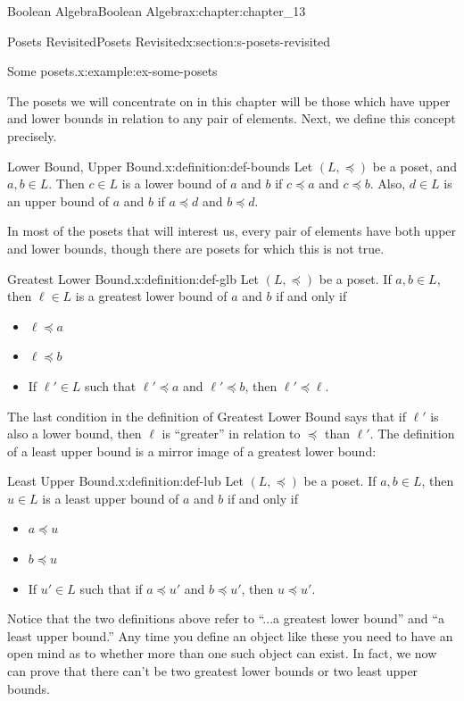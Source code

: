 \documentclass[twoside,10pt,]{book}
\numberwithin{equation}{section}
\begin{document}
\begin{chapterptx}{Boolean Algebra}{}{Boolean Algebra}{}{}{x:chapter:chapter_13}
\begin{sectionptx}{Posets Revisited}{}{Posets Revisited}{}{}{x:section:s-posets-revisited}
\begin{example}{Some posets.}{x:example:ex-some-posets}
%
\end{example}
The posets we will concentrate on in this chapter will be those which have upper and lower bounds in relation to any pair of elements. Next, we define this concept precisely.%
\begin{definition}{Lower Bound, Upper Bound.}{x:definition:def-bounds}%
%
%
Let \((L, \preceq)\) be a poset, and \(a, b \in  L\). Then \(c \in  L\) is a lower bound of \(a\) and \(b\) if \(c \preceq  a\) and \(c \preceq  b\). Also,  \(d \in  L\) is an upper bound of \(a\) and \(b\) if  \(a \preceq  d\) and \(b \preceq  d\).%
\end{definition}
In most of the posets that will interest us, every pair of elements have both upper and lower bounds, though there are posets for which this is not true.%
\begin{definition}{Greatest Lower Bound.}{x:definition:def-glb}%
%
Let \((L, \preceq)\) be a poset. If \(a, b \in  L\), then \(\ell \in  L\) is a greatest lower bound of \(a\) and \(b\)  if and only if%
\begin{itemize}[label=\textbullet]
\item{}\(\ell \preceq  a\)%
\item{}\(\ell \preceq  b\)%
\item{}If \(\ell' \in  L\) such that \(\ell' \preceq  a\) and \(\ell' \preceq  b\), then \(\ell' \preceq  \ell\).%
\end{itemize}
%
\end{definition}
The last condition in the definition of Greatest Lower Bound says that if  \(\ell'\)  is also a lower bound, then \(\ell\) is ``greater'' in relation to \(\preceq\) than \(\ell'\). The definition of a least upper bound is a mirror image of a greatest lower bound:%
\begin{definition}{Least Upper Bound.}{x:definition:def-lub}%
%
Let \((L, \preceq)\) be a poset. If \(a, b \in  L\), then \(u \in  L\) is a least upper bound of \(a\) and \(b\)  if and only if%
\begin{itemize}[label=\textbullet]
\item{}\(a \preceq  u\)%
\item{}\(b \preceq  u\)%
\item{}If \(u' \in  L\) such that if \(a \preceq  u'\) and \(b \preceq  u'\), then \(u \preceq  u'\).%
\end{itemize}
%
\end{definition}
Notice that the two definitions above refer to ``...a greatest lower bound''  and ``a least upper bound.''  Any time you define an object like these you need to have an open mind as to whether more than one such object can exist.  In fact, we now can prove that there can't be two greatest lower bounds or two least upper bounds.%

\end{sectionptx}
\end{chapterptx}
\end{document}
